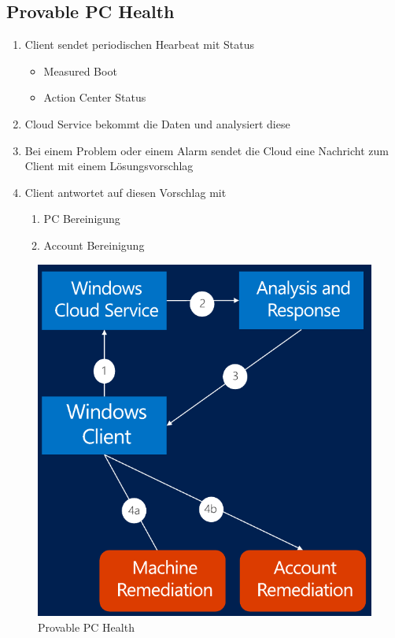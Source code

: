 \subsection{Provable PC Health}
\begin{enumerate}
    \item Client sendet periodischen Hearbeat mit Status 
    \begin{itemize}
        \item Measured Boot
        \item Action Center Status
    \end{itemize}
    \item Cloud Service bekommt die Daten und analysiert diese
    \item Bei einem Problem oder einem Alarm sendet die Cloud eine Nachricht zum Client mit einem Lösungsvorschlag
    \item Client antwortet auf diesen Vorschlag mit 
    \begin{enumerate}
        \item PC Bereinigung
        \item Account Bereinigung
    \end{enumerate}
\end{enumerate}
\begin{figure}[h]
\centering
\includegraphics[width=0.5\linewidth]{images/provable_pc_health.png}
\caption{Provable PC Health}
\label{fig:provablepchealth}
\end{figure}

\newpage

